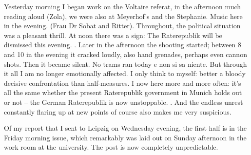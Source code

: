 
Yesterday morning I began work on the Voltaire referat, in the afternoon much reading aloud (Zola), we were also at Meyerhof's and the Stephanie. Music here in the evening. (Frau Dr Sobat and Ritter). Throughout, the political situation was a pleasant thrill. At noon there was a sign: The Raterepublik will be dismissed this evening. . Later in the afternoon the shooting started; between 8 and 10 in the evening it cracked loudly, also hand grenades, perhaps even cannon shots. Then it became silent. No trams ran today e non si sa niente.  But through it all I am no longer emotionally affected. I only think to myself: better a bloody decisive confrontation than half-measures. I now here more and more often: it's all the same whether the present Raterepublik government in Munich holds out or not -- the German Raterepublik is now unstoppable. . And the endless unrest constantly flaring up at new points of course also makes me very suspicious.

Of my report that I sent to Leipzig on Wednesday evening, the first half is in the Friday morning issue, which remarkably was laid out on Sunday afternoon in the work room at the university. The post is now completely unpredictable.